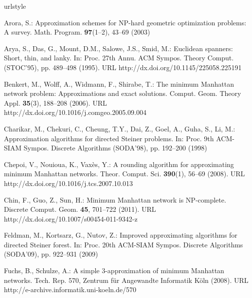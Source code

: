 \documentclass[11pt]{llncs}
\begin{document}
\begin{thebibliography}{10}
\providecommand{\url}[1]{{#1}}
\providecommand{\urlprefix}{URL }
\expandafter\ifx\csname urlstyle\endcsname\relax
  \providecommand{\doi}[1]{DOI~\discretionary{}{}{}#1}\else
  \providecommand{\doi}{DOI~\discretionary{}{}{}\begingroup
  \urlstyle{rm}\Url}\fi

Arora, S.: Approximation schemes for {NP}-hard geometric optimization problems:
  A survey.
\newblock Math. Program. \textbf{97}(1--2), 43--69 (2003)

Arya, S., Das, G., Mount, D.M., Salowe, J.S., Smid, M.: {Euclidean} spanners:
  Short, thin, and lanky.
\newblock In: Proc. 27th Annu. ACM Sympos. Theory Comput. (STOC'95), pp.
  489--498 (1995).
\newblock \urlprefix\url{http://dx.doi.org/10.1145/225058.225191}

Benkert, M., Wolff, A., Widmann, F., Shirabe, T.: The minimum {Manhattan}
  network problem: Approximations and exact solutions.
\newblock Comput. Geom. Theory Appl. \textbf{35}(3), 188--208 (2006).
\newblock \urlprefix\url{http://dx.doi.org/10.1016/j.comgeo.2005.09.004}

Charikar, M., Chekuri, C., Cheung, T.Y., Dai, Z., Goel, A., Guha, S., Li, M.:
  Approximation algorithms for directed {Steiner} problems.
\newblock In: Proc. 9th ACM-SIAM Sympos. Discrete Algorithms (SODA'98), pp.
  192--200 (1998)

Chepoi, V., Nouioua, K., Vax\`{e}s, Y.: A rounding algorithm for approximating
  minimum {Manhattan} networks.
\newblock Theor. Comput. Sci. \textbf{390}(1), 56--69 (2008).
\newblock \urlprefix\url{http://dx.doi.org/10.1016/j.tcs.2007.10.013}

Chin, F., Guo, Z., Sun, H.: Minimum {Manhattan} network is {NP}-complete.
\newblock Discrete Comput. Geom. \textbf{45}, 701--722 (2011).
\newblock \urlprefix\url{http://dx.doi.org/10.1007/s00454-011-9342-z}

Feldman, M., Kortsarz, G., Nutov, Z.: Improved approximating algorithms for
  directed {Steiner} forest.
\newblock In: Proc. 20th ACM-SIAM Sympos. Discrete Algorithms (SODA'09), pp.
  922--931 (2009)

Fuchs, B., Schulze, A.: A simple 3-approximation of minimum {Manhattan}
  networks.
\newblock Tech. Rep. 570, Zentrum f{\"u}r Angewandte Informatik K{\"o}ln
  (2008).
\newblock \urlprefix\url{http://e-archive.informatik.uni-koeln.de/570}


\end{thebibliography}
\end{document}
